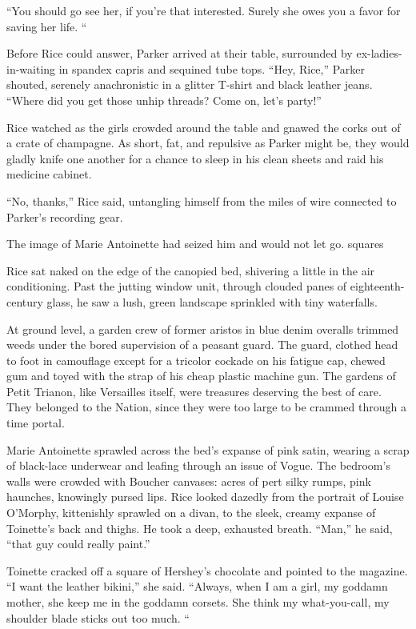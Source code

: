 “You should go see her, if you’re that interested. Surely she owes you a favor for saving her life. “

Before Rice could answer, Parker arrived at their table, surrounded by ex-ladies-in-waiting in spandex capris and sequined tube tops. “Hey, Rice,” Parker shouted, serenely anachronistic in a glitter T-shirt and black leather jeans. “Where did you get those unhip threads? Come on, let’s party!”

Rice watched as the girls crowded around the table and gnawed the corks out of a crate of champagne. As short, fat, and repulsive as Parker might be, they would gladly knife one another for a chance to sleep in his clean sheets and raid his medicine cabinet.

“No, thanks,” Rice said, untangling himself from the miles of wire connected to Parker’s recording gear.

The image of Marie Antoinette had seized him and would not let go.
squares

Rice sat naked on the edge of the canopied bed, shivering a little in the air conditioning. Past the jutting window unit, through clouded panes of eighteenth-century glass, he saw a lush, green landscape sprinkled with tiny waterfalls.

At ground level, a garden crew of former aristos in blue denim overalls trimmed weeds under the bored supervision of a peasant guard. The guard, clothed head to foot in camouflage except for a tricolor cockade on his fatigue cap, chewed gum and toyed with the strap of his cheap plastic machine gun. The gardens of Petit Trianon, like Versailles itself, were treasures deserving the best of care. They belonged to the Nation, since they were too large to be crammed through a time portal.

Marie Antoinette sprawled across the bed’s expanse of pink satin, wearing a scrap of black-lace underwear and leafing through an issue of Vogue. The bedroom’s walls were crowded with Boucher canvases: acres of pert silky rumps, pink haunches, knowingly pursed lips. Rice looked dazedly from the portrait of Louise O’Morphy, kittenishly sprawled on a divan, to the sleek, creamy expanse of Toinette’s back and thighs. He took a deep, exhausted breath. “Man,” he said, “that guy could really paint.”

Toinette cracked off a square of Hershey’s chocolate and pointed to the magazine. “I want the leather bikini,” she said. “Always, when I am a girl, my goddamn mother, she keep me in the goddamn corsets. She think my what-you-call, my shoulder blade sticks out too much. “

